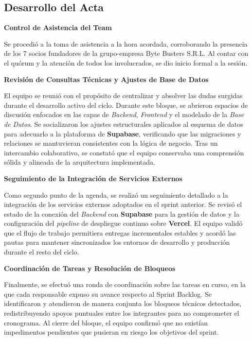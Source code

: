 \newpage
\subsection{Desarrollo del Acta}

\noindent \textbf{Control de Asistencia del Team}\par
Se procedió a la toma de asistencia a la hora acordada, corroborando la presencia de los 7 socios fundadores de la grupo-empresa Byte Busters S.R.L. Al contar con el quórum y la atención de todos los involucrados, se dio inicio formal a la sesión.

\vspace*{0.5cm}
\noindent \textbf{Revisión de Consultas Técnicas y Ajustes de Base de Datos}\par
El equipo se reunió con el propósito de centralizar y absolver las dudas surgidas durante el desarrollo activo del ciclo. Durante este bloque, se abrieron espacios de discusión enfocados en las capas de \textit{Backend}, \textit{Frontend} y el modelado de la \textit{Base de Datos}. Se socializaron los ajustes estructurales aplicados al esquema de datos para adecuarlo a la plataforma de \textbf{Supabase}, verificando que las migraciones y relaciones se mantuvieran consistentes con la lógica de negocio. Tras un intercambio colaborativo, se constató que el equipo conservaba una comprensión sólida y alineada de la arquitectura implementada.

\vspace*{0.5cm}
\noindent \textbf{Seguimiento de la Integración de Servicios Externos}\par
Como segundo punto de la agenda, se realizó un seguimiento detallado a la integración de los servicios externos adoptados en el sprint anterior. Se revisó el estado de la conexión del \textit{Backend} con \textbf{Supabase} para la gestión de datos y la configuración del \textit{pipeline} de despliegue continuo sobre \textbf{Vercel}. El equipo validó que el flujo de trabajo permitiera entregas incrementales estables y acordó las pautas para mantener sincronizados los entornos de desarrollo y producción durante el resto del ciclo.

\vspace*{0.5cm}
\noindent \textbf{Coordinación de Tareas y Resolución de Bloqueos}\par
Finalmente, se efectuó una ronda de coordinación sobre las tareas en curso, en la que cada responsable expuso su avance respecto al Sprint Backlog. Se identificaron y atendieron de manera conjunta los bloqueos técnicos detectados, redistribuyendo apoyos puntuales entre los integrantes para no comprometer el cronograma. Al cierre del bloque, el equipo confirmó que no existían impedimentos pendientes que pusieran en riesgo los objetivos del sprint.

